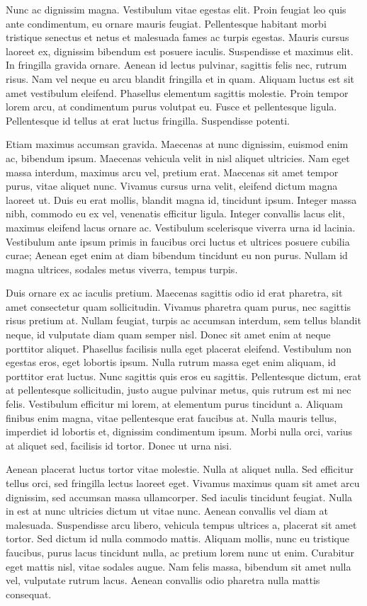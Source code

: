 \documentclass[
  ngerman,
  14pt,
  a4paper,
  DIV=11,
  twoside]{scrreprt}
\begin{document}
Nunc ac dignissim magna. Vestibulum vitae egestas elit. Proin feugiat
leo quis ante condimentum, eu ornare mauris feugiat. Pellentesque
habitant morbi tristique senectus et netus et malesuada fames ac turpis
egestas. Mauris cursus laoreet ex, dignissim bibendum est posuere
iaculis. Suspendisse et maximus elit. In fringilla gravida ornare.
Aenean id lectus pulvinar, sagittis felis nec, rutrum risus. Nam vel
neque eu arcu blandit fringilla et in quam. Aliquam luctus est sit amet
vestibulum eleifend. Phasellus elementum sagittis molestie. Proin tempor
lorem arcu, at condimentum purus volutpat eu. Fusce et pellentesque
ligula. Pellentesque id tellus at erat luctus fringilla. Suspendisse
potenti.

Etiam maximus accumsan gravida. Maecenas at nunc dignissim, euismod enim
ac, bibendum ipsum. Maecenas vehicula velit in nisl aliquet ultricies.
Nam eget massa interdum, maximus arcu vel, pretium erat. Maecenas sit
amet tempor purus, vitae aliquet nunc. Vivamus cursus urna velit,
eleifend dictum magna laoreet ut. Duis eu erat mollis, blandit magna id,
tincidunt ipsum. Integer massa nibh, commodo eu ex vel, venenatis
efficitur ligula. Integer convallis lacus elit, maximus eleifend lacus
ornare ac. Vestibulum scelerisque viverra urna id lacinia. Vestibulum
ante ipsum primis in faucibus orci luctus et ultrices posuere cubilia
curae; Aenean eget enim at diam bibendum tincidunt eu non purus. Nullam
id magna ultrices, sodales metus viverra, tempus turpis.

Duis ornare ex ac iaculis pretium. Maecenas sagittis odio id erat
pharetra, sit amet consectetur quam sollicitudin. Vivamus pharetra quam
purus, nec sagittis risus pretium at. Nullam feugiat, turpis ac accumsan
interdum, sem tellus blandit neque, id vulputate diam quam semper nisl.
Donec sit amet enim at neque porttitor aliquet. Phasellus facilisis
nulla eget placerat eleifend. Vestibulum non egestas eros, eget lobortis
ipsum. Nulla rutrum massa eget enim aliquam, id porttitor erat luctus.
Nunc sagittis quis eros eu sagittis. Pellentesque dictum, erat at
pellentesque sollicitudin, justo augue pulvinar metus, quis rutrum est
mi nec felis. Vestibulum efficitur mi lorem, at elementum purus
tincidunt a. Aliquam finibus enim magna, vitae pellentesque erat
faucibus at. Nulla mauris tellus, imperdiet id lobortis et, dignissim
condimentum ipsum. Morbi nulla orci, varius at aliquet sed, facilisis id
tortor. Donec ut urna nisi.

Aenean placerat luctus tortor vitae molestie. Nulla at aliquet nulla.
Sed efficitur tellus orci, sed fringilla lectus laoreet eget. Vivamus
maximus quam sit amet arcu dignissim, sed accumsan massa ullamcorper.
Sed iaculis tincidunt feugiat. Nulla in est at nunc ultricies dictum ut
vitae nunc. Aenean convallis vel diam at malesuada. Suspendisse arcu
libero, vehicula tempus ultrices a, placerat sit amet tortor. Sed dictum
id nulla commodo mattis. Aliquam mollis, nunc eu tristique faucibus,
purus lacus tincidunt nulla, ac pretium lorem nunc ut enim. Curabitur
eget mattis nisl, vitae sodales augue. Nam felis massa, bibendum sit
amet nulla vel, vulputate rutrum lacus. Aenean convallis odio pharetra
nulla mattis consequat.
\end{document}
